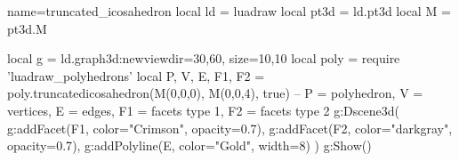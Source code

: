 \documentclass[border=5pt]{standalone}%
\begin{document}
\begin{luadraw}{name=truncated_icosahedron }
local ld = luadraw
local pt3d = ld.pt3d
local M = pt3d.M

local g = ld.graph3d:new{viewdir={30,60}, size={10,10}}
local poly = require 'luadraw_polyhedrons'
local P, V, E, F1, F2 = poly.truncatedicosahedron(M(0,0,0), M(0,0,4), true)
-- P = polyhedron, V = vertices, E = edges, F1 = facets type 1, F2 = facets type 2
g:Dscene3d(
    g:addFacet(F1, {color="Crimson", opacity=0.7}),
    g:addFacet(F2, {color="darkgray", opacity=0.7}),
    g:addPolyline(E, {color="Gold", width=8})
    )
g:Show() 
\end{luadraw}
\end{document}

